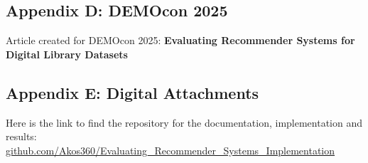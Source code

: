 \documentclass[\myFontSize,a4paper,oneside,hidelinks]{article}
\begin{document}
\clearpage
\renewcommand{\thepage}{D-\arabic{page}}
\setcounter{page}{1}
\subsection*{Appendix D: DEMOcon 2025} 
\renewcommand{\refname}{}
Article created for DEMOcon 2025: \textbf{Evaluating Recommender Systems for Digital Library Datasets}


\clearpage
\renewcommand{\thepage}{E-\arabic{page}}
\setcounter{page}{1}
\subsection*{Appendix E: Digital Attachments} 
\renewcommand{\refname}{}
\textnormal{
Here is the link to find the repository for the documentation, implementation and results: \\
\href{https://github.com/Akos360/Evaluating\_Recommender\_Systems\_Implementation.git}{github.com/Akos360/Evaluating\_Recommender\_Systems\_Implementation}}
\end{document}

